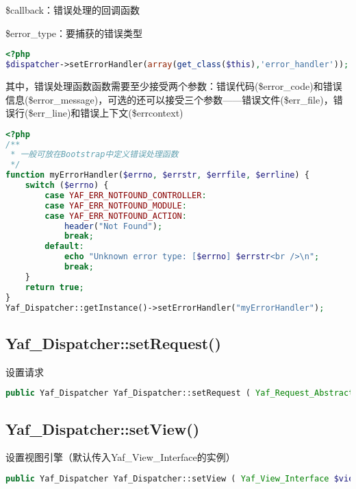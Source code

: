 \begin{compactitem}
\item \$callback：错误处理的回调函数
\item \$error\_type：要捕获的错误类型
\end{compactitem}

\begin{lstlisting}[language=PHP]
<?php
$dispatcher->setErrorHandler(array(get_class($this),'error_handler'));
\end{lstlisting}

其中，错误处理函数函数需要至少接受两个参数：错误代码(\$error\_code)和错误信息(\$error\_message)，可选的还可以接受三个参数——错误文件(\$err\_file)，错误行(\$err\_line)和错误上下文(\$errcontext)


\begin{lstlisting}[language=PHP]
<?php
/**
 * 一般可放在Bootstrap中定义错误处理函数
 */
function myErrorHandler($errno, $errstr, $errfile, $errline) {
    switch ($errno) {
        case YAF_ERR_NOTFOUND_CONTROLLER:
        case YAF_ERR_NOTFOUND_MODULE:
        case YAF_ERR_NOTFOUND_ACTION:
            header("Not Found");
            break;
        default:
            echo "Unknown error type: [$errno] $errstr<br />\n";
            break;
    }
    return true;
}
Yaf_Dispatcher::getInstance()->setErrorHandler("myErrorHandler");
\end{lstlisting}



\subsection{Yaf\_Dispatcher::setRequest()}

设置请求

\begin{lstlisting}[language=PHP]
public Yaf_Dispatcher Yaf_Dispatcher::setRequest ( Yaf_Request_Abstract $request )
\end{lstlisting}


\subsection{Yaf\_Dispatcher::setView()}

设置视图引擎（默认传入Yaf\_View\_Interface的实例）

\begin{lstlisting}[language=PHP]
public Yaf_Dispatcher Yaf_Dispatcher::setView ( Yaf_View_Interface $view )
\end{lstlisting}

